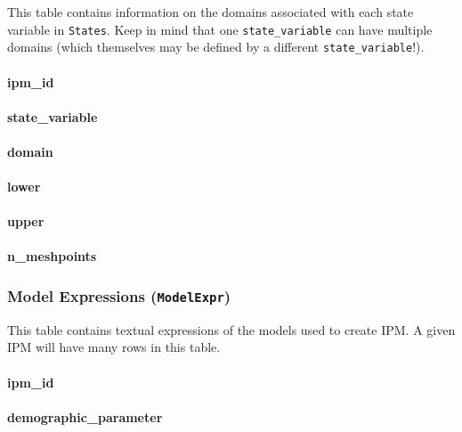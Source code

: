 \documentclass[]{article}
\let\oldparagraph\paragraph
\renewcommand{\paragraph}[1]{\oldparagraph{#1}\mbox{}}
\begin{document}
This table contains information on the domains associated with each
state variable in \texttt{States}. Keep in mind that one
\texttt{state\_variable} can have multiple domains (which themselves may
be defined by a different \texttt{state\_variable}!).

\paragraph{ipm\_id}\label{ipm_id-2}

\paragraph{state\_variable}\label{state_variable-1}

\paragraph{domain}\label{domain}

\paragraph{lower}\label{lower}

\paragraph{upper}\label{upper}

\paragraph{n\_meshpoints}\label{n_meshpoints}

\subsubsection{\texorpdfstring{Model Expressions
(\texttt{ModelExpr})}{Model Expressions (ModelExpr)}}\label{model-expressions-modelexpr}

This table contains textual expressions of the models used to create
IPM. A given IPM will have many rows in this table.

\paragraph{ipm\_id}\label{ipm_id-3}

\paragraph{demographic\_parameter}\label{demographic_parameter}
\end{document}

